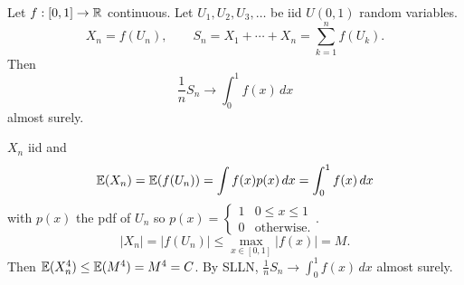 \documentclass[10pt, a4paper]{article}
\begin{document}
\begin{problem}
    Let $f : [0, 1] \to \mathbb{R}$ continuous.
    Let $U_1, U_2, U_3, \dotsc$ be iid $U(0, 1)$ random variables.
    \[
    X_n = f(U_n),\qquad S_n = X_1 + \dotsi + X_n = \sum_{k = 1}^{n}f(U_k).
    \]
    Then
    \[
    \frac{1}{n}S_n \to \int_{0}^{1}f(x)\,dx
    \]
    almost surely.

    \begin{solution}
        $X_n$ iid and
        \[
        \mathbb{E}(X_n) = \mathbb{E}(f(U_n)) = \int f(x)p(x)\,dx = \int_{0}^{1}f(x)\,dx
        \]
        with $p(x)$ the pdf of $U_n$ so $p(x) = \begin{cases}
            1 & 0 \leq x \leq 1 \\ 0 &\text{otherwise}.
        \end{cases}$.
        \[
        |X_n| = |f(U_n)| \leq \max_{x \in [0, 1]}|f(x)| = M.
        \]
        Then $\mathbb{E}(X_n ^ 4) \leq \mathbb{E}(M ^ 4) = M ^ 4 = C$.
        By SLLN,
        $\frac{1}{n}S_n \to \int_{0}^{1}f(x)\,dx$ almost surely.
    \end{solution}
\end{problem}
\end{document}

